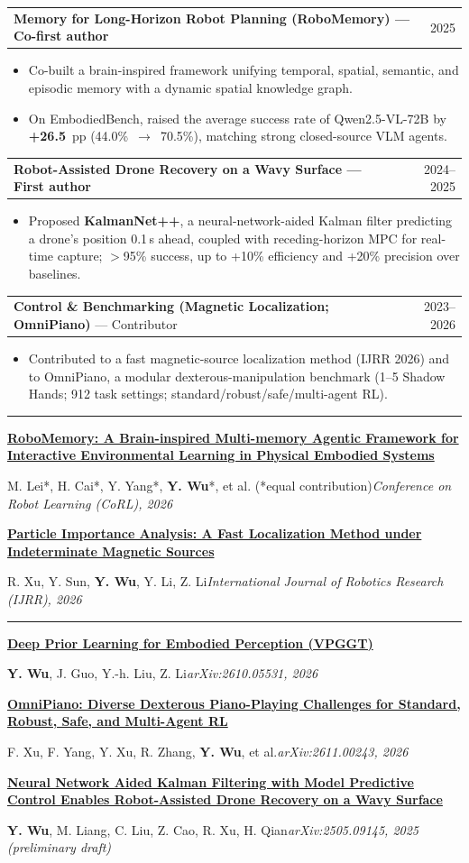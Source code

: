 \documentclass[10pt,letterpaper]{article}
\makeatletter
\newcommand{\cvsection}[1]{%
  \par\addvspace{2pt}{\large\bfseries #1}\par\nobreak
  \vspace{0.5pt}\hrule\vspace{1pt}}
\newcommand{\role}[2]{%
  \noindent\begin{tabularx}{\linewidth}{@{}Xr@{}}
    #1 & #2
  \end{tabularx}}
\newcommand{\paper}[4]{%
  \par\addvspace{1.5pt}\textbf{\href{#1}{#2}}\par
  {\small #3\enspace\textbar\enspace\emph{#4}\par}}
\newcommand{\me}{\textbf{Y. Wu}}
\newenvironment{tight}{\begin{itemize}[leftmargin=1.2em,itemsep=0.5pt,topsep=1pt,parsep=0pt]}{\end{itemize}}
\makeatother
\begin{document}
\role{\textbf{Memory for Long-Horizon Robot Planning \textnormal{(RoboMemory)} --- Co-first author}}{2025}
\begin{tight}
  \item Co-built a brain-inspired framework unifying temporal, spatial, semantic, and
        episodic memory with a dynamic spatial knowledge graph.
  \item On EmbodiedBench, raised the average success rate of Qwen2.5-VL-72B by
        \textbf{+26.5}~pp (44.0\%~$\rightarrow$~70.5\%), matching strong closed-source VLM agents.
\end{tight}

\role{\textbf{Robot-Assisted Drone Recovery on a Wavy Surface --- First author}}{2024--2025}
\begin{tight}
  \item Proposed \textbf{KalmanNet++}, a neural-network-aided Kalman filter predicting a
        drone's position 0.1\,s ahead, coupled with receding-horizon MPC for real-time capture;
        $>$95\% success, up to +10\% efficiency and +20\% precision over baselines.
\end{tight}

\role{\textbf{Control \& Benchmarking \textnormal{(Magnetic Localization; OmniPiano)}} --- Contributor}{2023--2026}
\begin{tight}
  \item Contributed to a fast magnetic-source localization method (IJRR 2026) and to OmniPiano,
        a modular dexterous-manipulation benchmark (1--5 Shadow Hands; 912 task settings; standard/robust/safe/multi-agent RL).
\end{tight}

\cvsection{Peer-Reviewed Publications}
\paper{https://sp4595.github.io/robomemory/}
  {RoboMemory: A Brain-inspired Multi-memory Agentic Framework for
   Interactive Environmental Learning in Physical Embodied Systems}
  {M. Lei*, H. Cai*, Y. Yang*, \me*, et al. (*equal contribution)}
  {Conference on Robot Learning (CoRL), 2026}
\paper{https://doi.org/10.1177/02783649261455368}
  {Particle Importance Analysis: A Fast Localization Method under
   Indeterminate Magnetic Sources}
  {R. Xu, Y. Sun, \me, Y. Li, Z. Li}
  {International Journal of Robotics Research (IJRR), 2026}

\cvsection{Preprints}
\paper{https://arxiv.org/abs/2610.05531}
  {Deep Prior Learning for Embodied Perception (VPGGT)}
  {\me, J. Guo, Y.-h. Liu, Z. Li}{arXiv:2610.05531, 2026}
\paper{https://arxiv.org/abs/2611.00243}
  {OmniPiano: Diverse Dexterous Piano-Playing Challenges for
   Standard, Robust, Safe, and Multi-Agent RL}
  {F. Xu, F. Yang, Y. Xu, R. Zhang, \me, et al.}
  {arXiv:2611.00243, 2026}
\paper{https://arxiv.org/abs/2505.09145v3}
  {Neural Network Aided Kalman Filtering with Model Predictive Control
   Enables Robot-Assisted Drone Recovery on a Wavy Surface}
  {\me, M. Liang, C. Liu, Z. Cao, R. Xu, H. Qian}
  {arXiv:2505.09145, 2025 (preliminary draft)}
\end{document}
